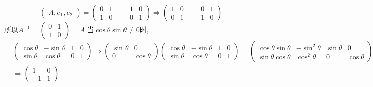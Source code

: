 ﻿\documentclass{book} \usepackage{exsheets} \usepackage{xeCJK}
\begin{document}
\begin{solution}
$$
  \begin{pmatrix}
    A,e_1,e_2
  \end{pmatrix}=
  \begin{pmatrix}
    0&1&&&1&0\\
    1&0&&&0&1
  \end{pmatrix}\Rightarrow
  \begin{pmatrix}
    1&0&&&0&1\\
    0&1&&&1&0
  \end{pmatrix}
$$
所以$A^{-1}=
\begin{pmatrix}
  0&1\\
  1&0
\end{pmatrix}=A.  $当$\cos\theta\sin\theta\neq 0$时,
\begin{align*}
  &\begin{pmatrix}
    \cos\theta&-\sin\theta&1&0\\
    \sin\theta&\cos\theta&0&1
  \end{pmatrix}\Rightarrow
                             \begin{pmatrix}
                               \sin\theta&0\\
                               0&\cos\theta
                             \end{pmatrix}
                                  \begin{pmatrix}
                                    \cos\theta&-\sin\theta&1&0\\
                                    \sin\theta&\cos\theta&0&1
                                  \end{pmatrix}=
                                                             \begin{pmatrix}
                                                               \cos\theta\sin\theta&-\sin^{2}\theta&\sin\theta&0\\
                                                               \sin\theta\cos\theta&\cos^2\theta&0&\cos\theta
                                                             \end{pmatrix}\\&\Rightarrow
                                                                              \begin{pmatrix}
                                                                                1&0\\
                                                                                -1&1

\end{pmatrix}
\end{align*}
\end{solution}
\end{document}
